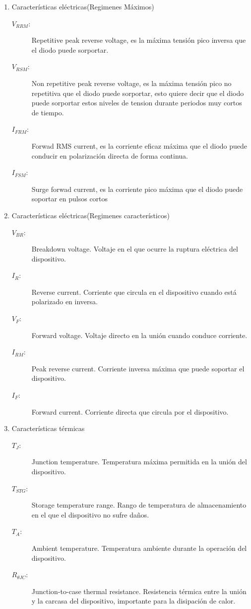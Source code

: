	\begin{enumerate}
		\item Características eléctricas(Regimenes Máximos)

		\begin{description}
		\item[$V_{RRM}$:] Repetitive peak reverse voltage, es la máxima tensión pico inversa que el diodo puede sorportar.
		\item[$V_{RSM}$:] Non repetitive peak reverse voltage, es la máxima tensión pico no repetitiva que el diodo puede sorportar, esto quiere decir que el diodo puede sorportar estos niveles de tension durante periodos muy cortos de tiempo.
		\item[$I_{FRM}$:] Forwad RMS current, es la corriente eficaz máxima que el diodo puede conducir en polarización directa de forma continua.
		\item[$I_{FSM}$:] Surge forwad current, es la corriente pico máxima que el diodo puede soportar en pulsos cortos
		\end{description}

		\item Características eléctricas(Regimenes característicos)

		\begin{description}
		\item[$V_{BR}$:] Breakdown voltage. Voltaje en el que ocurre la ruptura eléctrica del dispositivo.
		\item[$I_{R}$:] Reverse current. Corriente que circula en el dispositivo cuando está polarizado en inversa.
		\item[$V_{F}$:] Forward voltage. Voltaje directo en la unión cuando conduce corriente.
		\item[$I_{RM}$:] Peak reverse current. Corriente inversa máxima que puede soportar el dispositivo.


		\item[$I_{F}$:] Forward current. Corriente directa que circula por el dispositivo.
		\end{description}

		\item Características térmicas

		\begin{description}
		\item[$T_{J}$:] Junction temperature. Temperatura máxima permitida en la unión del dispositivo.
		\item[$T_{STG}$:] Storage temperature range. Rango de temperatura de almacenamiento en el que el dispositivo no sufre daños.
		\item[$T_{A}$:] Ambient temperature. Temperatura ambiente durante la operación del dispositivo.
		\item[$R_{\theta JC}$:] Junction-to-case thermal resistance. Resistencia térmica entre la unión y la carcasa del dispositivo, importante para la disipación de calor.
		\end{description}


\end{enumerate}
